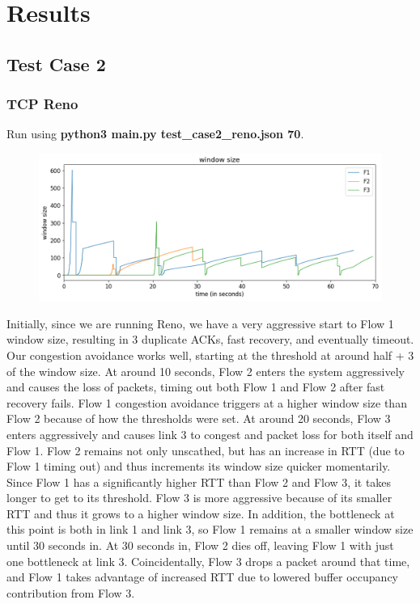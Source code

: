 \documentclass{article}
\begin{document}
\section{Results}

\subsection{Test Case 2}

\subsubsection{TCP Reno}

Run using \textbf{python3 main.py test\_case2\_reno.json 70}.

\begin{figure}[H]
\centering
\includegraphics[width = \textwidth]{test_case2_reno window size.png}
\end{figure}

Initially, since we are running Reno, we have a very aggressive start to Flow 1 window size, resulting in 3 duplicate ACKs, fast recovery, and eventually timeout. Our congestion avoidance works well, starting at the threshold at around half + 3 of the window size. At around 10 seconds, Flow 2 enters the system aggressively and causes the loss of packets, timing out both Flow 1 and Flow 2 after fast recovery fails. Flow 1 congestion avoidance triggers at a higher window size than Flow 2 because of how the thresholds were set. At around 20 seconds, Flow 3 enters aggressively and causes link 3 to congest and packet loss for both itself and Flow 1. Flow 2 remains not only unscathed, but has an increase in RTT (due to Flow 1 timing out) and thus increments its window size quicker momentarily. Since Flow 1 has a significantly higher RTT than Flow 2 and Flow 3, it takes longer to get to its threshold. Flow 3 is more aggressive because of its smaller RTT and thus it grows to a higher window size. In addition, the bottleneck at this point is both in link 1 and link 3, so Flow 1 remains at a smaller window size until 30 seconds in. At 30 seconds in, Flow 2 dies off, leaving Flow 1 with just one bottleneck at link 3. Coincidentally, Flow 3 drops a packet around that time, and Flow 1 takes advantage of increased RTT due to lowered buffer occupancy contribution from Flow 3. 
\end{document}
